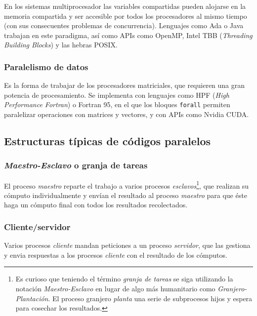 En los sistemas multiprocesador las variables compartidas pueden alojarse en la memoria compartida y ser accesible por todos los procesadores al mismo tiempo (con sus consecuentes problemas de concurrencia).
Lenguajes como Ada o Java trabajan en este paradigma, así como APIs como OpenMP, Intel TBB (\textit{Threading Building Blocks}) y las hebras POSIX\@.

\subsubsection{Paralelismo de datos}

Es la forma de trabajar de los procesadores matriciales, que requieren una gran potencia de procesamiento.
Se implementa con lenguajes como HPF (\textit{High Performance Fortran}) o Fortran 95, en el que los bloques \texttt{forall} permiten paralelizar operaciones con matrices y vectores, y con APIs como Nvidia CUDA\@.

\subsection{Estructuras típicas de códigos paralelos}\label{estructuras-codigos-paralelos}

\subsubsection{\textit{Maestro-Esclavo} o granja de tareas}

El proceso \textit{maestro} reparte el trabajo a varios procesos \textit{esclavos}\footnote{Es curioso que teniendo el término \textit{granja de tareas} se siga utilizando la notación \textit{Maestro-Esclavo} en lugar de algo más humanitario como \textit{Granjero-Plantación}. El proceso granjero \textit{planta} una serie de subprocesos hijos y espera para cosechar los resultados.}, que realizan su cómputo individualmente y envían el resultado al proceso \textit{maestro} para que éste haga un cómputo final con todos los resultados recolectados.

\subsubsection{Cliente/servidor}

Varios procesos \textit{cliente} mandan peticiones a un proceso \textit{servidor}, que las gestiona y envia respuestas a los procesos \textit{cliente} con el resultado de los cómputos.

